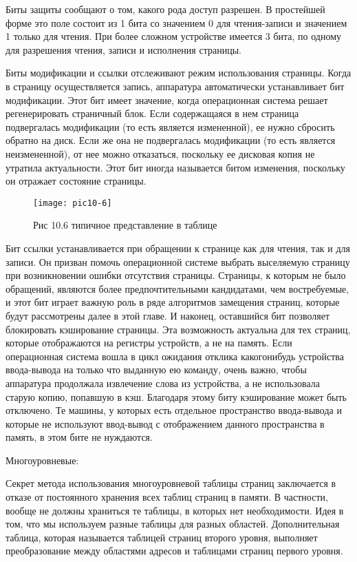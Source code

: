 Биты защиты сообщают о том, какого рода доступ разрешен. В простейшей форме это поле состоит из 1 бита со значением 0 для чтения-записи и значением 1 только для чтения. При более сложном устройстве имеется 3 бита, по одному для разрешения чтения, записи и исполнения страницы.

Биты модификации и ссылки отслеживают режим использования страницы. Когда в страницу осуществляется запись, аппаратура автоматически устанавливает бит модификации. Этот бит имеет значение, когда операционная система решает регенерировать страничный блок. Если содержащаяся в нем страница подвергалась модификации (то есть является измененной), ее нужно сбросить обратно на диск. Если же она не подвергалась модификации (то есть является неизмененной), от нее можно отказаться, поскольку ее дисковая копия не утратила актуальности. Этот бит иногда называется битом изменения, поскольку он отражает состояние страницы.

\begin{figure}
  \begin{center}
  \texttt{[image: pic10-6]}
  \caption{Рис 10.6 типичное представление в таблице}
  \end{center}
\end{figure}

Бит ссылки устанавливается при обращении к странице как для чтения, так и для записи. Он призван помочь операционной системе выбрать выселяемую страницу при возникновении ошибки отсутствия страницы. Страницы, к которым не было обращений, являются более предпочтительными кандидатами, чем востребуемые, и этот бит играет важную роль в ряде алгоритмов замещения страниц, которые будут рассмотрены далее в этой главе. И наконец, оставшийся бит позволяет блокировать кэширование страницы. Эта возможность актуальна для тех страниц, которые отображаются на регистры устройств, а не на память. Если операционная система вошла в цикл ожидания отклика какогонибудь устройства ввода-вывода на только что выданную ею команду, очень важно, чтобы аппаратура продолжала извлечение слова из устройства, а не использовала старую копию, попавшую в кэш. Благодаря этому биту кэширование может быть отключено. Те машины, у которых есть отдельное пространство ввода-вывода и которые не используют ввод-вывод с отображением данного пространства в память, в этом бите не нуждаются.

Многоуровневые:

Секрет метода использования многоуровневой таблицы страниц заключается в отказе от постоянного хранения всех таблиц страниц в памяти. В частности, вообще не должны храниться те таблицы, в которых нет необходимости. Идея в том, что мы используем разные таблицы для разных областей. Дополнительная таблица, которая называется таблицей страниц второго уровня, выполняет преобразование между областями адресов и таблицами страниц первого уровня.

